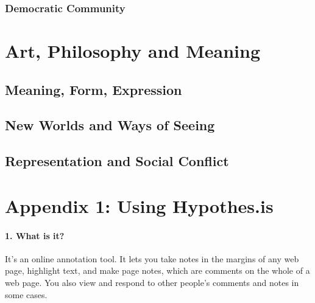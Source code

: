\documentclass[
  12pt, openany]{book}
\begin{document}
\hypertarget{democratic-community}{%
\subsection{Democratic Community}\label{democratic-community}}

\hypertarget{art-philosophy-and-meaning}{%
\chapter{Art, Philosophy and Meaning}\label{art-philosophy-and-meaning}}

\hypertarget{meaning-form-expression}{%
\section{Meaning, Form, Expression}\label{meaning-form-expression}}

\hypertarget{new-worlds-and-ways-of-seeing}{%
\section{New Worlds and Ways of Seeing}\label{new-worlds-and-ways-of-seeing}}

\hypertarget{representation-and-social-conflict}{%
\section{Representation and Social Conflict}\label{representation-and-social-conflict}}

\hypertarget{appendix-1}{%
\chapter*{Appendix 1: Using Hypothes.is}\label{appendix-1}}


\hypertarget{what-is-it}{%
\subsubsection*{1. What is it?}\label{what-is-it}}


It's an online annotation tool. It lets you take notes in the margins of any web page, highlight text, and make page notes, which are comments on the whole of a web page. You also view and respond to other people's comments and notes in some cases.
\end{document}

